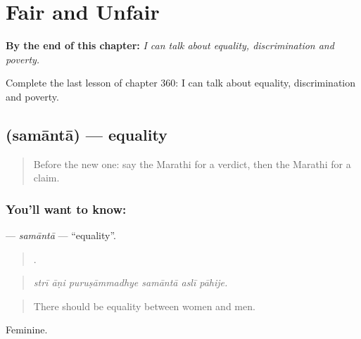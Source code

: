 
\chapter{Fair and Unfair}
\label{ch:mr-fair-and-unfair}

\begin{chapteropening}
\textbf{By the end of this chapter:} \emph{I can talk about equality, discrimination and poverty.}

Complete the last lesson of chapter 360: I can talk about equality, discrimination and poverty.
\end{chapteropening}

\section[\texorpdfstring{\mr{समानता} (samāntā)}{समानता (samāntā)}]{ (samāntā) — equality}

\label{lesson:MR-C360-samanta}



\begin{quote}
Before the new one: say the Marathi for a verdict, then the Marathi for a claim.
\end{quote}

\subsection*{You'll want to know: }
\textbf{} — \emph{samāntā} — \textquotedblleft{}equality\textquotedblright{}.

\begin{quote}
     .
\end{quote}

\begin{quote}
\emph{strī āṇi puruṣāmmadhye samāntā aslī pāhije.}
\end{quote}

\begin{quote}
There should be equality between women and men.
\end{quote}

Feminine.


